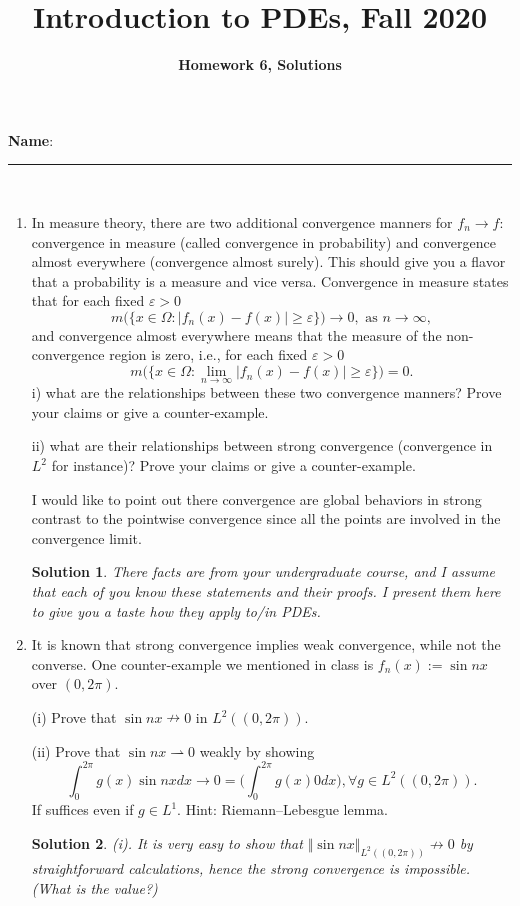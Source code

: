 \documentclass[6pt]{article}
\title{Introduction to PDEs, Fall 2020}
\author{\textbf{Homework 6, Solutions}}
\date{}
\newtheorem{solution}{Solution}
\numberwithin{equation}{section}
\begin{document}
\maketitle

\textbf{Name}:\rule{1 in}{0.001 in} \\
\begin{enumerate}
\item In measure theory, there are two additional convergence manners for $f_n\rightarrow f$: convergence in measure (called convergence in probability) and convergence almost everywhere (convergence almost surely).  This should give you a flavor that a probability is a measure and vice versa.  Convergence in measure states that for each fixed $\varepsilon>0$
    \[m\big(\{x\in\Omega: |f_n(x)-f(x)|\geq\varepsilon\}\big)\rightarrow 0, \text{~as~}n\rightarrow \infty,\]
    and convergence almost everywhere means that the measure of the non-convergence region is zero, i.e., for each fixed $\varepsilon>0$
    \[m\big(\{x\in\Omega: \lim_{n\rightarrow\infty}|f_n(x)-f(x)|\geq\varepsilon\}\big)=0.\]
i) what are the relationships between these two convergence manners?  Prove your claims or give a counter-example.

ii) what are their relationships between strong convergence (convergence in $L^2$ for instance)?  Prove your claims or give a counter-example.

I would like to point out there convergence are global behaviors in strong contrast to the pointwise convergence since all the points are involved in the convergence limit.
\begin{solution}
There facts are from your undergraduate course, and I assume that each of you know these statements and their proofs.  I present them here to give you a taste how they apply to/in PDEs.
\end{solution}

\item  It is known that strong convergence implies weak convergence, while not the converse.  One counter-example we mentioned in class is $f_n(x):=\sin nx$ over $(0,2\pi)$.

(i)  Prove that $\sin nx \nrightarrow 0 $ in $L^2((0,2\pi))$.

(ii)  Prove that
$\sin nx \rightharpoonup 0$ weakly by showing
\[\int_0^{2\pi} g(x)\sin nx dx\rightarrow 0=\Big(\int_0^{2\pi} g(x)0  dx\Big),\forall g\in L^2((0,2\pi)).\]
If suffices even if $g\in L^1$.  Hint: Riemann--Lebesgue lemma.
\begin{solution}
(i).  It is very easy to show that $\Vert \sin nx\Vert_{L^2((0,2\pi))}\not \rightarrow 0$ by straightforward calculations, hence the strong convergence is impossible.  (What is the value?)


\end{solution}
\end{enumerate}
\end{document}
